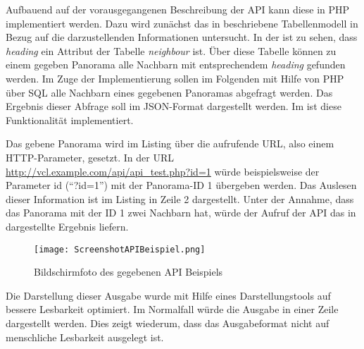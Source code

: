 
Aufbauend auf der vorausgegangenen Beschreibung der API kann diese in PHP
implementiert werden. Dazu wird zunächst das in 
beschriebene Tabellenmodell in Bezug auf die darzustellenden Informationen
untersucht. In der  ist zu sehen, dass
\textit{heading} ein Attribut der Tabelle \textit{neighbour} ist. Über diese
Tabelle können zu einem gegeben Panorama alle Nachbarn mit entsprechendem
\textit{heading} gefunden werden.
Im Zuge der Implementierung sollen im Folgenden mit Hilfe von PHP über SQL alle
Nachbarn eines gegebenen Panoramas abgefragt werden. Das Ergebnis dieser
Abfrage soll im JSON-Format dargestellt werden. Im 
ist diese Funktionalität implementiert.



Das gebene Panorama wird im Listing über die aufrufende URL, also einem
HTTP\footnotemark -Parameter, gesetzt. In der URL
\url{http://vcl.example.com/api/api\_test.php?id=1} würde beispielsweise der
Parameter id ("`?id=1"') mit der Panorama-ID 1 übergeben werden. Das
Auslesen dieser Information ist im Listing in Zeile 2 dargestellt.
Unter der Annahme, dass das Panorama mit der ID 1 zwei Nachbarn hat, würde der
Aufruf der API das in  dargestellte Ergebnis
liefern.


\clearpage

\begin{figure}[htb]
\centering
\texttt{[image: ScreenshotAPIBeispiel.png]}
\caption[API Beispiel]{Bildschirmfoto des gegebenen API Beispiels}
\label{fig:ScreenshotAPIBeispiel}
\end{figure}

Die Darstellung dieser Ausgabe wurde mit Hilfe eines Darstellungstools auf
bessere Lesbarkeit optimiert. Im Normalfall würde die Ausgabe in einer Zeile
dargestellt werden. Dies zeigt wiederum, dass das Ausgabeformat nicht auf
menschliche Lesbarkeit ausgelegt ist.

